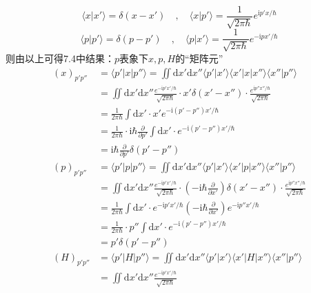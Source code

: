 \documentclass[a4paper]{article}
\begin{document}
\begin{CJK*}{UTF8}{song}
{    $$\langle x|x'\rangle =\delta(x-x')\quad,\quad
        \langle x|p'\rangle = \frac{1}{\sqrt{2\pi\hbar}}e^{\mathrm{i}p'x/\hbar}$$
    $$\langle p|p'\rangle =\delta(p-p')\quad,\quad
        \langle p|x'\rangle = \frac{1}{\sqrt{2\pi\hbar}}e^{-\mathrm{i}p x'/\hbar}$$        
    则由以上可得7.4中结果：$p$表象下$x,p,H$的“矩阵元”
    \begin{equation*}\begin{split}
    (x)_{p'p''} 
        & = \langle p'|x|p''\rangle
            = \iint\mathrm{d}x'\mathrm{d}x''\langle p'|x'\rangle\langle x'|x|x''\rangle
            \langle x''|p''\rangle\\
        & = \iint\mathrm{d}x'\mathrm{d}x''
            \frac{e^{-\mathrm{i}p'x'/\hbar}}{\sqrt{2\pi\hbar}}
            \cdot x'\delta(x'-x'')\cdot
            \frac{e^{\mathrm{i}p''x''/\hbar}}{\sqrt{2\pi\hbar}}\\
        & = \frac{1}{2\pi\hbar}\int\mathrm{d}x'\cdot x' e^{-\mathrm{i}(p'-p'')x'/\hbar}\\
        & = \frac{1}{2\pi\hbar}\cdot\mathrm{i}\hbar\frac{\partial}{\partial p'}
            \int\mathrm{d}x'\cdot e^{-\mathrm{i}(p'-p'')x'/\hbar}\\
        & = \mathrm{i}\hbar\frac{\partial}{\partial p'}\delta(p'-p'')\\
    (p)_{p'p''}
        & = \langle p'|p|p''\rangle
            = \iint\mathrm{d}x'\mathrm{d}x''\langle p'|x'\rangle\langle x'|p|x''\rangle
            \langle x''|p''\rangle\\
        & = \iint\mathrm{d}x'\mathrm{d}x''
            \frac{e^{-\mathrm{i}p'x'/\hbar}}{\sqrt{2\pi\hbar}}
            \cdot(-\mathrm{i}\hbar\frac{\partial}{\partial x'})\delta(x'-x'')\cdot
            \frac{e^{\mathrm{i}p''x''/\hbar}}{\sqrt{2\pi\hbar}}\\
        & = \frac{1}{2\pi\hbar}\int\mathrm{d}x'
            \cdot e^{-\mathrm{i}p'x'/\hbar}
            (-\mathrm{i}\hbar\frac{\partial}{\partial x'})
            e^{-\mathrm{i}p''x'/\hbar}\\
        & = \frac{1}{2\pi\hbar}\cdot p''
            \int\mathrm{d}x'\cdot e^{-\mathrm{i}(p'-p'')x'/\hbar}\\
        & = p'\delta(p'-p'')\\
    (H)_{p'p''}
        & = \langle p'|H|p''\rangle
            = \iint\mathrm{d}x'\mathrm{d}x''\langle p'|x'\rangle\langle x'|H|x''\rangle
            \langle x''|p''\rangle\\
        & = \iint\mathrm{d}x'\mathrm{d}x''
            \frac{e^{-\mathrm{i}p'x'/\hbar}}{\sqrt{2\pi\hbar}}

\end{split}
\end{equation*}}
\end{CJK*}
\end{document}
